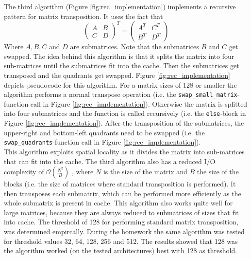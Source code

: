 \documentclass{scrartcl}
\begin{document}
    The third algorithm (Figure \ref{fig:rec_implementation}) implements a recursive pattern for matrix transposition. It uses the fact that 
    \begin{equation*}
        \begin{pmatrix}
            A & B \\
            C & D
        \end{pmatrix}^T = 
        \begin{pmatrix}
            A^T & C^T \\
            B^T & D^T
        \end{pmatrix}
    \end{equation*}
    Where $A, B, C$ and $D$ are submatrices. Note that the submatrices $B$ and $C$ get swapped. The idea behind this algorithm is that it splits the matrix into four sub-matrices until the submatrices fit into the cache. Then the submatrices get transposed and the quadrants get swapped. Figure \ref{fig:rec_implementation} depicts pseudocode for this algorithm. For a matrix sizes of 128 or smaller the algorithm performs a normal transpose operation (i.e. the \lstinline{swap_small_matrix}-function call in Figure \ref{fig:rec_implementation}). Otherwise the matrix is splitted into four submatrices and the function is called recursively (i.e. the \lstinline{else}-block in Figure \ref{fig:rec_implementation}). After the transposition of the submatrices, the upper-right and bottom-left quadrants need to be swapped (i.e. the \lstinline{swap_quadrants}-function call in Figure \ref{fig:rec_implementation}).\\
    This algorithm exploits spatial locality as it divides the matrix into sub-matrices that can fit into the cache. The third algorithm also has a reduced I/O complexity of $\mathcal{O}(\frac{N^2}{B})$ \cite{algorithmica}, where $N$ is the size of the matrix and $B$ the size of the blocks (i.e. the size of matrices where standard transposition is performed). It then transposes each submatrix, which can be performed more efficiently as the whole submatrix is present in cache. This algorithm also works quite well for large matrices, because they are always reduced to submatrices of sizes that fit into cache. The threshold of 128 for performing standard matrix transposition, was determined empircally. During the homework the same algorithm was tested for threshold values 32, 64, 128, 256 and 512. The results showed that 128 was the algorithm worked (on the tested architectures) best with 128 as threshold. 
\end{document}
